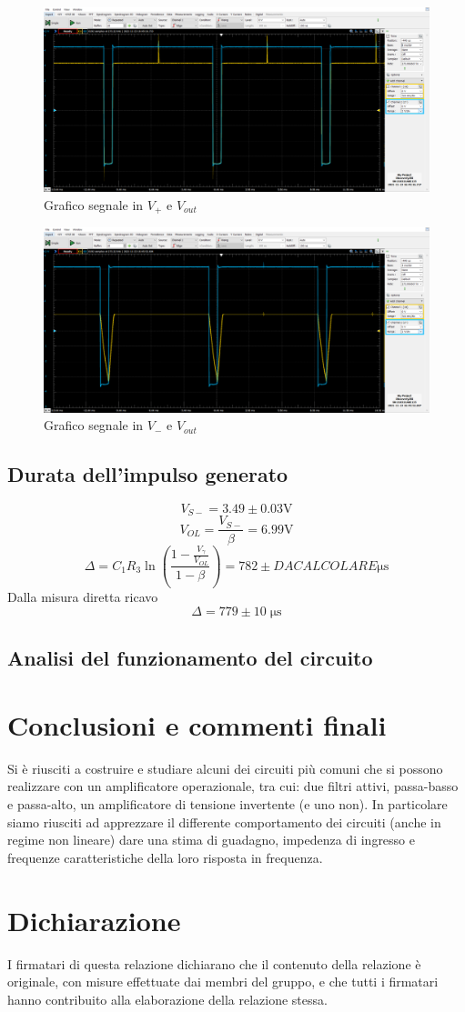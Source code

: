 \documentclass[10pt,a4paper]{article}
\begin{document}
\begin{figure}[htbp]
\centering
\includegraphics[scale=0.42]{monostabileV+}
\caption{Grafico segnale in $V_{+}$ e $V_{out}$}
\end{figure}

\begin{figure}[htbp]
\centering
\includegraphics[scale=0.42]{monostabileV-}
\caption{Grafico segnale in $V_{-}$ e $V_{out}$}
\end{figure}

\subsection{Durata dell'impulso generato}
\[
V_{S-}= 3.49 \pm 0.03 \si{\V}
\]
\[
V_{OL}=\frac{V_{S-}}{\beta}=6.99 \si{\V}
\]
\[
\Delta= C_1 R_3 \ln(\frac{1-\frac{V_{\gamma}}{V_{OL}}}{1-\beta})= 782 \pm D A   C A L C O L A R E \si{\micro\s}
\]
Dalla misura diretta ricavo
\[
\Delta= 779 \pm 10 \;\si{\micro\s}
\]

\subsection{Analisi del funzionamento del circuito}

\section*{Conclusioni e commenti finali}
Si è riusciti a costruire e studiare alcuni dei circuiti più comuni che si
possono realizzare con un amplificatore operazionale, tra cui: due filtri
attivi, passa-basso e passa-alto, un amplificatore di tensione invertente
(e uno non).
In particolare siamo riusciti ad apprezzare il differente comportamento dei
circuiti (anche in regime non lineare) dare una stima di guadagno, impedenza di
ingresso e frequenze caratteristiche della loro risposta in frequenza.

\section*{Dichiarazione}
I firmatari di questa relazione dichiarano che il contenuto della relazione \`e
originale, con misure effettuate dai membri del gruppo, e che tutti i firmatari
hanno contribuito alla elaborazione della relazione stessa.
\end{document}
